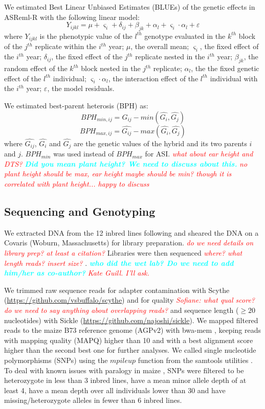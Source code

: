\documentclass[9pt,twocolumn,twoside]{gsajnl}
\newcommand{\yang}[1]{\textcolor{cyan}{\emph{\bf  #1}} }
\newcommand{\jri}[1]{\textcolor{red}{ \emph{ #1}} }
\begin{document}
We estimated Best Linear Unbiased Estimates (BLUEs) of the genetic effects in ASReml-R \citep{gilmour2009asreml} with the following linear model: 
%
\[Y_{ijkl} = \mu + \varsigma_{i} + \delta_{ij} + \beta_{jk} + \alpha_{l} +  \varsigma_{i} \cdot \alpha_{l} + \varepsilon\]
%
where 
$Y_{ijkl}$ is the phenotypic value of the $l^{th}$ genotype evaluated in the $k^{th}$ block of the $j^{th}$ replicate within the $i^{th}$ year; 
$\mu$, the overall mean; 
$\varsigma_{i}$, the fixed effect of the $i^{th}$ year;
$\delta_{ij}$, the fixed effect of the $j^{th}$ replicate nested in the $i^{th}$ year; 
$\beta_{jk}$, the random effect of the $k^{th}$ block nested in the $j^{th}$ replicate; 
$\alpha_{l}$, the the fixed genetic effect  of the $l^{th}$ individual; 
$\varsigma_{i} \cdot \alpha_{l}$, the interaction effect of the $l^{th}$ individual with the $i^{th}$ year; 
$\varepsilon$, the model residuals. 

We estimated best-parent heterosis (BPH) as:
%
\[ BPH_{min,ij}=\hat{G_{ij}}-min(\hat{G_{i}} ,\hat{G_{j}}) \] 
\[ BPH_{max,ij}=\hat{G_{ij}}-max(\hat{G_{i}} ,\hat{G_{j}}) \]
%
where $\hat{G_{ij}}$, $\hat{G_{i}}$ and $\hat{G_{j}}$ are the genetic values of the hybrid and its two parents $i$ and $j$. $BPH_{min}$ was used instead of $BPH_{max}$ for ASI. \jri{what about ear height and DTS?} \yang{Did you mean plant height? We need to discuss about this.} \jri{no plant height should be max, ear height maybe should be min? though it is correlated with plant height... happy to discuss}

\subsection*{Sequencing and Genotyping}

We extracted DNA from the 12 inbred lines following \citet{Doyle1987} and sheared the DNA on a Covaris (Woburn, Massachusetts) for library preparation. \jri{do we need details on library prep? at least a citation?}
Libraries were then sequenced \jri{where? what length reads? insert size?}. \yang{who did the wet lab? Do we need to add him/her as co-author?} \jri{Kate Guill. I'll ask.}

We trimmed raw sequence reads for adapter contamination with Scythe  (\url{https://github.com/vsbuffalo/scythe}) and for quality \jri{Sofiane: what qual score? do we need to say anything about overlapping reads?} and sequence length ($\geq 20$ nucleotides) with Sickle (\url{https://github.com/najoshi/sickle}). 
We mapped filtered reads to the maize B73 reference genome (AGPv2) with bwa-mem \citep{Li2009B}, keeping reads with mapping quality (MAPQ) higher than 10 and with a best alignment score higher than the second best one for further analyses.
We called single nucleotide polymorphisms (SNPs) using the $mpileup$ function from the samtools utilities \citep{Li2009}. 
To deal with known issues with paralogy in maize \citep{Chia2012}, SNPs were filtered to be heterozygote in less than 3 inbred lines, have a mean minor allele depth of at least 4, have a mean depth over all individuals lower than 30 and have missing/heterozygote alleles in fewer than 6 inbred lines. 
\end{document}
